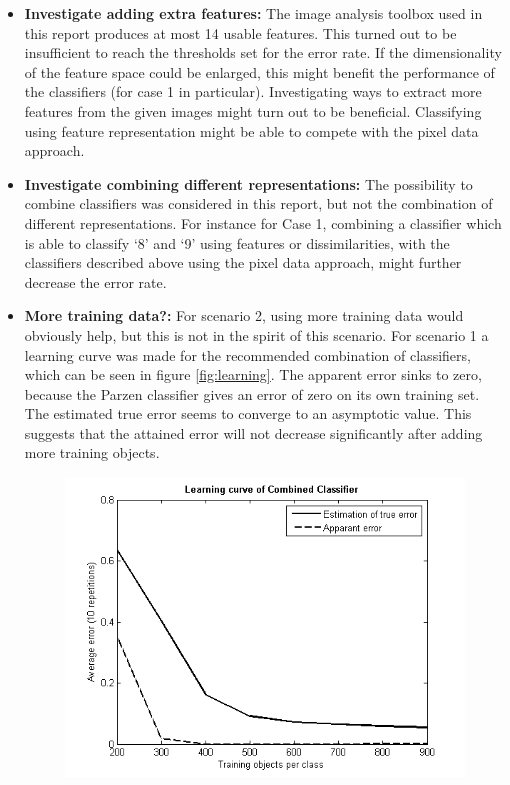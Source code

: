 \begin{itemize}
	\item \textbf{Investigate adding extra features:} The image analysis toolbox used in this report produces at most 14 usable features. This turned out to be insufficient to reach the thresholds set for the error rate. If the dimensionality of the feature space could be enlarged, this might benefit the performance of the classifiers (for case 1 in particular). Investigating ways to extract more features from the given images might turn out to be beneficial. Classifying using feature representation might be able to compete with the pixel data approach.
	\item \textbf{Investigate combining different representations:} The possibility to combine classifiers was considered in this report, but not the combination of different representations. For instance for Case 1, combining a classifier which is able to classify ‘8’ and ‘9’ using features or dissimilarities, with the classifiers described above using the pixel data approach, might further decrease the error rate. 
	\item \textbf{More training data?:} For scenario 2, using more training data would obviously help, but this is not in the spirit of this scenario. For scenario 1 a learning curve was made for the recommended combination of classifiers, which can be seen in figure \ref{fig:learning}. The apparent error sinks to zero, because the Parzen classifier gives an error of zero on its own training set. The estimated true error seems to converge to an asymptotic value. This suggests that the attained error will not decrease significantly after adding more training objects.
\begin{figure}[H]
	\centering
	\includegraphics[scale=0.8]{images/pr_figure_5.png}

\end{figure}
\end{itemize}
